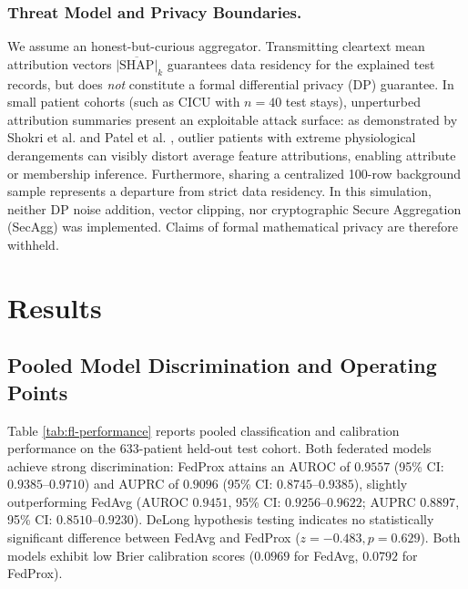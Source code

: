 \documentclass[conference,a4paper]{IEEEtran}
\begin{document}
\subsubsection{Threat Model and Privacy Boundaries.}
We assume an honest-but-curious aggregator. Transmitting cleartext mean attribution vectors $\overline{|\text{SHAP}|}_k$ guarantees data residency for the explained test records, but does \emph{not} constitute a formal differential privacy (DP) guarantee. In small patient cohorts (such as CICU with $n=40$ test stays), unperturbed attribution summaries present an exploitable attack surface: as demonstrated by Shokri et al. \cite{shokri2021privacy} and Patel et al. \cite{patel2022model}, outlier patients with extreme physiological derangements can visibly distort average feature attributions, enabling attribute or membership inference. Furthermore, sharing a centralized 100-row background sample represents a departure from strict data residency. In this simulation, neither DP noise addition, vector clipping, nor cryptographic Secure Aggregation (SecAgg) \cite{bonawitz2017practical} was implemented. Claims of formal mathematical privacy are therefore withheld.

\section{Results}\label{sec:results}

\subsection{Pooled Model Discrimination and Operating Points}
Table \ref{tab:fl-performance} reports pooled classification and calibration performance on the 633-patient held-out test cohort. Both federated models achieve strong discrimination: FedProx attains an AUROC of $0.9557$ (95\% CI: $0.9385$--$0.9710$) and AUPRC of $0.9096$ (95\% CI: $0.8745$--$0.9385$), slightly outperforming FedAvg (AUROC $0.9451$, 95\% CI: $0.9256$--$0.9622$; AUPRC $0.8897$, 95\% CI: $0.8510$--$0.9230$). DeLong hypothesis testing indicates no statistically significant difference between FedAvg and FedProx ($z = -0.483, p = 0.629$). Both models exhibit low Brier calibration scores ($0.0969$ for FedAvg, $0.0792$ for FedProx).
\end{document}
